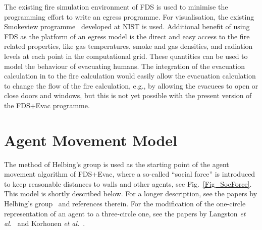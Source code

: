 \documentclass[12pt,a4paper,final,twoside]{stylevk}
\begin{document}
The existing fire simulation environment of FDS is used to minimise
the programming effort to write an egress programme.  For
visualisation, the existing Smokeview programme~\cite{SV_UserGuide}
developed at NIST is used.  Additional benefit of using FDS as the
platform of an egress model is the direct and easy access to the fire
related properties, like gas temperatures, smoke and gas densities,
and radiation levels at each point in the computational grid.  These
quantities can be used to model the behaviour of evacuating humans.
The integration of the evacuation calculation in to the fire
calculation would easily allow the evacuation calculation to change
the flow of the fire calculation, e.g., by allowing the
evacuees to open or close doors and windows, but this is not yet
possible with the present version of the FDS+Evac programme.


\section{Agent Movement Model}\label{Sec_MoveModel}

\noindent The method of Helbing's group is used as the starting point
of the agent movement algorithm of FDS+Evac, where a so-called
``social force'' is introduced to keep reasonable distances to walls
and other agents, see Fig.~\ref{Fig_SocForce}.  This model is
shortly described below.  For a longer description, see the papers by
Helbing's group~\cite{Helbing95, Helbing00, Helbing02, Werner03} and
references therein.  For the modification of the one-circle
representation of an agent to a three-circle one, see the papers by
Langston {\em et al.}~\cite{Langston06} and Korhonen {\em et
  al.}~\cite{Korhonen07a, Korhonen07b, Korhonen08a, Korhonen08b}.
\end{document}
